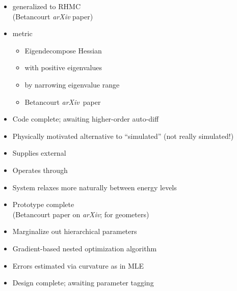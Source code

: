 \documentclass[10pt]{report}
\newcommand{\sld}[1]{\newpage{\noindent\LARGE \ \ \
    \textcolor{MidnightBlue}{\bfseries #1}}\vspace*{4pt}}
\newcommand{\myemph}[1]{{\color{MidnightBlue}{\bfseries #1}}}
\begin{document}
\sld{Riemannian Manifold HMC}
\begin{itemize}
\item \myemph{NUTS} generalized to RHMC
\\ {\footnotesize (Betancourt {\slshape arXiv} paper)}
\item \myemph{SoftAbs} metric
\vspace*{-4pt}
\begin{itemize}\footnotesize
\item Eigendecompose Hessian
\item \myemph{positive definite} with positive eigenvalues
\item \myemph{condition} by narrowing eigenvalue range
\item Betancourt {\slshape arXiv}\ paper
\end{itemize}
\vfill
\item Code complete; awaiting higher-order auto-diff
\end{itemize}

\sld{Thermodynamic Sampler}
\begin{itemize}
\item Physically motivated alternative to ``simulated''
  \myemph{annealing and tempering} (not really simulated!)
\item Supplies external \myemph{heat bath}
\item Operates through \myemph{contact manifold}
\item System relaxes more naturally between energy levels
\vfill
\item Prototype complete
\\ {\small (Betancourt paper on {\slshape arXiv}; for geometers)}
\end{itemize}

\sld{Marginal Maximum Likelihood}
\begin{itemize}
\item Marginalize out hierarchical parameters
\item Gradient-based nested optimization algorithm
\item Errors estimated via curvature as in MLE
\vfill
\item Design complete; awaiting parameter tagging
\end{itemize}
\end{document}
